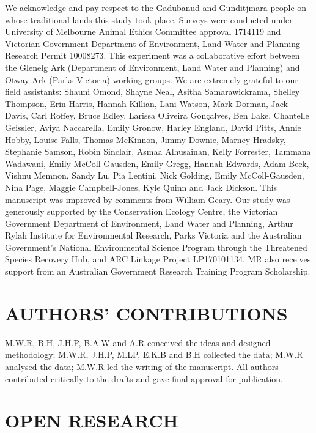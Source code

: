 \documentclass[]{elsarticle} %
\begin{document}
We acknowledge and pay respect to the Gadubanud and Gunditjmara people on whose traditional lands this study took place. Surveys were conducted under University of Melbourne Animal Ethics Committee approval 1714119 and Victorian Government Department of Environment, Land Water and Planning Research Permit 10008273. This experiment was a collaborative effort between the Glenelg Ark (Department of Environment, Land Water and Planning) and Otway Ark (Parks Victoria) working groups.
We are extremely grateful to our field assistants: Shauni Omond, Shayne Neal, Asitha Samarawickrama, Shelley Thompson, Erin Harris, Hannah Killian, Lani Watson, Mark Dorman, Jack Davis, Carl Roffey, Bruce Edley, Larissa Oliveira Gonçalves, Ben Lake, Chantelle Geissler, Aviya Naccarella, Emily Gronow, Harley England, David Pitts, Annie Hobby, Louise Falls, Thomas McKinnon, Jimmy Downie, Marney Hradsky, Stephanie Samson, Robin Sinclair, Asmaa Alhusainan, Kelly Forrester, Tammana Wadawani, Emily McColl-Gausden, Emily Gregg, Hannah Edwards, Adam Beck, Vishnu Memnon, Sandy Lu, Pia Lentini, Nick Golding, Emily McColl-Gausden, Nina Page, Maggie Campbell-Jones, Kyle Quinn and Jack Dickson. This manuscript was improved by comments from William Geary. Our study was generously supported by the Conservation Ecology Centre, the Victorian Government Department of Environment, Land Water and Planning, Arthur Rylah Institute for Environmental Research, Parks Victoria and the Australian Government's National Environmental Science Program through the Threatened Species Recovery Hub, and ARC Linkage Project LP170101134. MR also receives support from an Australian Government Research Training Program Scholarship.

\hypertarget{authors-contributions}{%
\section{AUTHORS' CONTRIBUTIONS}\label{authors-contributions}}

M.W.R, B.H, J.H.P, B.A.W and A.R conceived the ideas and designed methodology; M.W.R, J.H.P, M.LP, E.K.B and B.H collected the data; M.W.R analysed the data; M.W.R led the writing of the manuscript. All authors contributed critically to the drafts and gave final approval for publication.

\hypertarget{open-research}{%
\section{OPEN RESEARCH}\label{open-research}}
\end{document}
